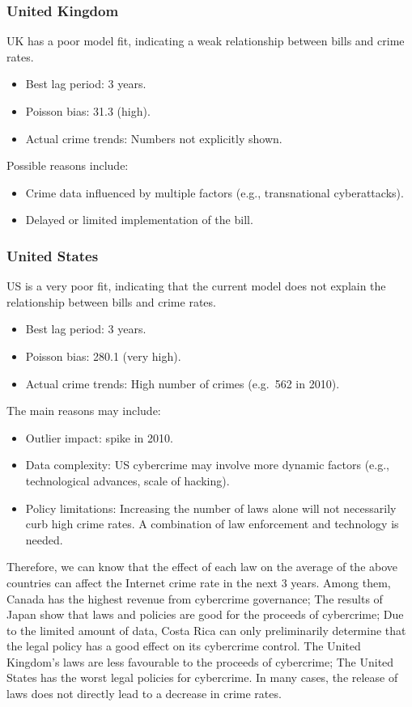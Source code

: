     \subsubsection*{United Kingdom}
        UK has a poor model fit, indicating a weak relationship between bills and crime rates.
        \begin{itemize}
            \item Best lag period: 3 years.
            \item Poisson bias: 31.3 (high).
            \item Actual crime trends: Numbers not explicitly shown.
        \end{itemize}
        Possible reasons include:
        \begin{itemize}
            \item Crime data influenced by multiple factors (e.g., transnational cyberattacks).
            \item Delayed or limited implementation of the bill.
        \end{itemize}
    \subsubsection*{United States}
        US is a very poor fit,
        indicating that the current model does not explain the relationship between bills and crime rates.
        \begin{itemize}
            \item Best lag period: 3 years.
            \item Poisson bias: 280.1 (very high).
            \item Actual crime trends: High number of crimes (e.g.\ 562 in 2010).
        \end{itemize}
        The main reasons may include:
        \begin{itemize}
            \item Outlier impact: spike in 2010.
            \item Data complexity: US cybercrime may involve more dynamic factors
                (e.g., technological advances, scale of hacking).
            \item Policy limitations: Increasing the number of laws alone will not necessarily curb high crime rates.
                A combination of law enforcement and technology is needed.
        \end{itemize}

        Therefore, we can know that the effect of each law on the average of the above countries
        can affect the Internet crime rate in the next 3 years.
        Among them, Canada has the highest revenue from cybercrime governance;
        The results of Japan show that laws and policies are good for the proceeds of cybercrime;
        Due to the limited amount of data,
        Costa Rica can only preliminarily determine that the legal policy has a good effect on its cybercrime control.
        The United Kingdom's laws are less favourable to the proceeds of cybercrime;
        The United States has the worst legal policies for cybercrime.
        In many cases, the release of laws does not directly lead to a decrease in crime rates.


